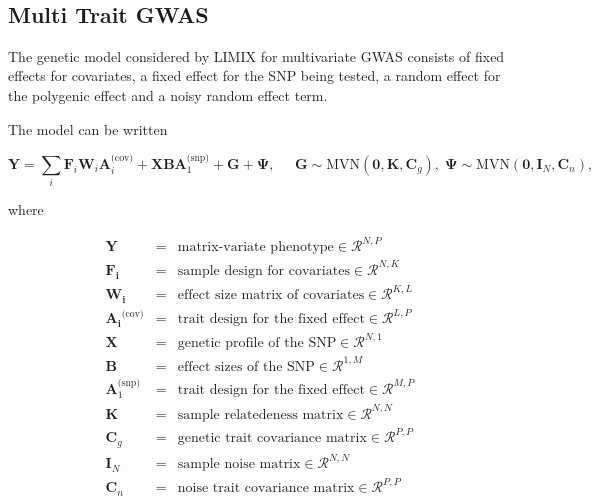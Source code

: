\documentclass{article}
\begin{document}
    \begin{center}
    \end{center}
    { \hspace*{\fill} \\}
    

    \subsection{Multi Trait GWAS}


    The genetic model considered by LIMIX for multivariate GWAS consists of
fixed effects for covariates, a fixed effect for the SNP being tested, a
random effect for the polygenic effect and a noisy random effect term.

The model can be written

\begin{equation}
\mathbf{Y}=
\sum_i\mathbf{F}_i\boldsymbol{W}_i\boldsymbol{A}^\text{(cov)}_i
+\mathbf{XBA}_1^\text{(snp)}+\mathbf{G}+\boldsymbol{\Psi},\;\;\;\;\;
\mathbf{G}\sim\text{MVN}(\mathbf{0},\mathbf{K},\mathbf{C}_g),\;
\boldsymbol{\Psi}\sim\text{MVN}(\mathbf{0},\mathbf{I}_N,\mathbf{C}_n),
\end{equation}

where

\begin{eqnarray}
\mathbf{Y}   &=& \text{matrix-variate phenotype} \in \mathcal{R}^{N,P} \\
\mathbf{F_i}   &=& \text{sample design for covariates} \in \mathcal{R}^{N,K} \\
\mathbf{W_i}   &=& \text{effect size matrix of covariates} \in \mathcal{R}^{K,L} \\
\mathbf{A_i}^\text{(cov)} &=& \text{trait design for the fixed effect} \in \mathcal{R}^{L,P} \\
\mathbf{X}   &=& \text{genetic profile of the SNP} \in \mathcal{R}^{N,1} \\
\mathbf{B}   &=& \text{effect sizes of the SNP} \in \mathcal{R}^{1,M} \\
\mathbf{A}_1^\text{(snp)} &=& \text{trait design for the fixed effect} \in \mathcal{R}^{M,P} \\
\mathbf{K}   &=& \text{sample relatedeness matrix} \in \mathcal{R}^{N,N} \\
\mathbf{C}_g &=& \text{genetic trait covariance matrix} \in \mathcal{R}^{P,P} \\
\mathbf{I}_N &=& \text{sample noise matrix} \in \mathcal{R}^{N,N} \\
\mathbf{C}_n &=& \text{noise trait covariance matrix} \in \mathcal{R}^{P,P}
\end{eqnarray}
\end{document}
